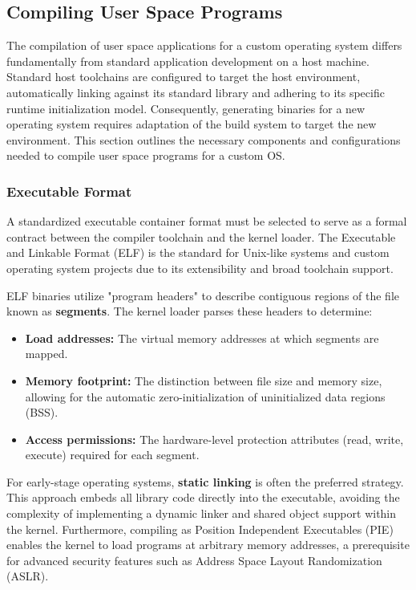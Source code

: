\documentclass[a4paper,10pt,twoside]{report}
\theoremstyle{definition}
\begin{document}
\subsection{Compiling User Space Programs}

The compilation of user space applications for a custom operating system differs fundamentally from standard application development on a host machine. Standard host toolchains are configured to target the host environment, automatically linking against its standard library and adhering to its specific runtime initialization model. Consequently, generating binaries for a new operating system requires adaptation of the build system to target the new environment. This section outlines the necessary components and configurations needed to compile user space programs for a custom OS.

\subsubsection{Executable Format}

A standardized executable container format must be selected to serve as a formal contract between the compiler toolchain and the kernel loader. The Executable and Linkable Format (ELF) is the standard for Unix-like systems and custom operating system projects due to its extensibility and broad toolchain support.

ELF binaries utilize "program headers" to describe contiguous regions of the file known as \textbf{segments}. The kernel loader parses these headers to determine:
\begin{itemize}
\item \textbf{Load addresses:} The virtual memory addresses at which segments are mapped.
\item \textbf{Memory footprint:} The distinction between file size and memory size, allowing for the automatic zero-initialization of uninitialized data regions (BSS).
\item \textbf{Access permissions:} The hardware-level protection attributes (read, write, execute) required for each segment.
\end{itemize}

For early-stage operating systems, \textbf{static linking} is often the preferred strategy. This approach embeds all library code directly into the executable, avoiding the complexity of implementing a dynamic linker and shared object support within the kernel. Furthermore, compiling as Position Independent Executables (PIE) enables the kernel to load programs at arbitrary memory addresses, a prerequisite for advanced security features such as Address Space Layout Randomization (ASLR).
\end{document}
